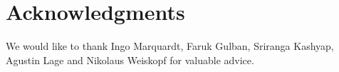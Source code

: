 \clearpage
\section{Acknowledgments}
We would like to thank Ingo Marquardt, Faruk Gulban, Sriranga Kashyap, Agustin Lage and Nikolaus Weiskopf for valuable advice.

\clearpage
\printbibliography[heading=subbibnumbered, title={References}]